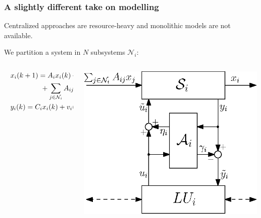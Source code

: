 \documentclass[presentation]{beamer}
\begin{document}
\begin{frame}
	\frametitle{A slightly different take on modelling}

	Centralized approaches are resource-heavy and monolithic models are not available.

	\medskip
	We partition a system in $N$ subsystems $\mathcal N_i$:
	\vfill
	\begin{columns}
		\begin{column}{0.5\linewidth}
			\begin{equation*}
				\hspace*{2ex}
				\begin{aligned}
					&x_i(k+1) = A_{i} x_i(k) + B_i \tilde u_i(k) \\
						&\hspace{10ex} + \sum_{j \in \mathcal{N}_i} A_{ij} x_j(k)  + w_i(k)\\
					&y_i(k) = C_i x_i(k) + v_i(k) 
				\end{aligned}\label{eq:CPS-i}
			\end{equation*}
		\end{column}
		\begin{column}{0.49\linewidth}
			\includegraphics[width=\textwidth]{fig/ndist-obs-generic-ecc.eps}
		\end{column}
	\end{columns}
\end{frame}
\end{document}
